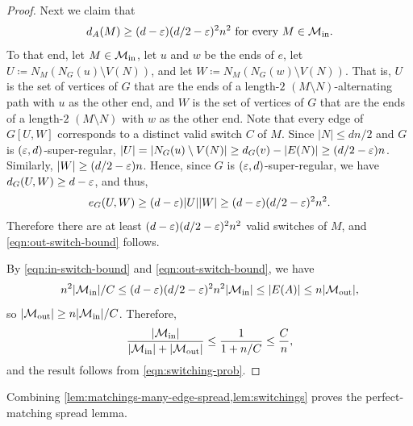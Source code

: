 \documentclass[11pt]{amsart}
\begin{document}
\begin{proof}
    Next we claim that
    \begin{equation}\label{eqn:out-switch-bound}
        d_A(M) \geq (d - \varepsilon)(d / 2 - \varepsilon)^2 n^2 \text{ for every } M \in \mathcal M_{\mathrm{in}}.
    \end{equation}
    To that end, let $M \in \mathcal M_{\mathrm{in}}$, let $u$ and $w$ be the ends of $e$, let $U \coloneqq N_M(N_G(u)\setminus V(N))$, and let $W \coloneqq N_M(N_G(w)\setminus V(N))$.  That is, $U$ is the set of vertices of $G$ that are the ends of a length-$2$ $(M\setminus N)$-alternating path with $u$ as the other end, and $W$ is the set of vertices of $G$ that are the ends of a length-$2$ $(M \setminus N)$ with $w$ as the other end.  Note that every edge of $G[U, W]$ corresponds to a distinct valid switch $C$ of $M$.  Since $|N| \leq dn / 2$ and $G$ is $(\varepsilon, d)$-super-regular, $|U| = |N_G(u)\setminus V(N)| \geq d_G(v) - |E(N)| \geq (d/2 - \varepsilon)n$.  Similarly, $|W| \geq (d / 2 - \varepsilon)n$.  Hence, since $G$ is $(\varepsilon, d)$-super-regular, we have $d_G(U, W) \geq d - \varepsilon$, and thus,
    \begin{equation*}
        e_G(U, W) \geq (d - \varepsilon)|U||W| \geq (d - \varepsilon)(d / 2 - \varepsilon)^2 n^2.
    \end{equation*}
    Therefore there are at least $(d - \varepsilon)(d / 2 - \varepsilon)^2 n^2$ valid switches of $M$, and \cref{eqn:out-switch-bound} follows.

    By \eqref{eqn:in-switch-bound} and \eqref{eqn:out-switch-bound}, we have
    \begin{equation*}
      n^2|\mathcal M_{\mathrm{in}}| / C \leq (d - \varepsilon)(d / 2 - \varepsilon)^2 n^2|\mathcal M_{\mathrm{in}}| \leq |E(A)| \leq n|\mathcal M_{\mathrm{out}}|,
    \end{equation*}
    so $|\mathcal M_{\mathrm{out}}| \geq n|\mathcal M_{\mathrm{in}}| / C$.  Therefore, 
    \begin{equation*}
        \frac{|\mathcal M_{\mathrm{in}}|}{|\mathcal M_{\mathrm{in}}| + |\mathcal M_{\mathrm{out}}|} \leq \frac{1}{1 + n / C} \leq \frac{C}{n},
    \end{equation*}
    and the result follows from \cref{eqn:switching-prob}.   
\end{proof}

Combining \cref{lem:matchings-many-edge-spread,lem:switchings} proves the
perfect-matching spread lemma.
\end{document}
